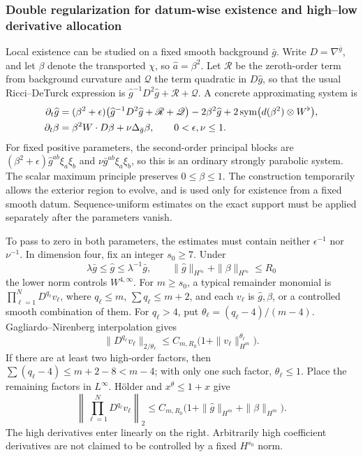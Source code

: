 \documentclass[a4paper,11pt]{article}
\numberwithin{equation}{section}
\theoremstyle{definition}
\begin{document}
\subsubsection{Double regularization for datum-wise existence and high--low derivative allocation}\label{sec:tame-start}
Local existence can be studied on a fixed smooth background $\bar g$. Write $D=\nabla^{\bar g}$,
and let $\beta$ denote the transported $\chi$, so $\widehat a=\beta^2$.
Let $\mathscr R$ be the zeroth-order term from background curvature and $\mathscr Q$ the term quadratic in
$D\widehat g$, so that the usual Ricci--DeTurck expression is
$\widehat g^{-1}D^2\widehat g+\mathscr R+\mathscr Q$.
A concrete approximating system is
\begin{align}
\partial_t\widehat g
&=(\beta^2+\epsilon)
 \bigl(\widehat g^{-1}D^2\widehat g+\mathscr R+\mathscr Q\bigr)
-2\beta^2\widehat g
+2\operatorname{sym}\bigl(d(\beta^2)\otimes W^\flat\bigr),\notag\\
\partial_t\beta
&=\beta^2W\cdot D\beta+\nu\Delta_{\bar g}\beta,
\qquad 0<\epsilon,\nu\le1.\label{eq:double-regularized-start}
\end{align}
For fixed positive parameters, the second-order principal blocks are
$(\beta^2+\epsilon)\widehat g^{ab}\xi_a\xi_b$ and
$\nu\bar g^{ab}\xi_a\xi_b$, so this is an ordinary strongly parabolic system.
The scalar maximum principle preserves $0\le\beta\le1$.
The construction temporarily allows the exterior region to evolve, and is used only for existence from a fixed smooth datum.
Sequence-uniform estimates on the exact support must be applied separately after the parameters vanish.

To pass to zero in both parameters, the estimates must contain neither $\epsilon^{-1}$ nor $\nu^{-1}$.
In dimension four, fix an integer $s_0\ge7$. Under
\[
\lambda\bar g\le\widehat g\le\lambda^{-1}\bar g,
\qquad \|\widehat g\|_{H^{s_0}}+\|\beta\|_{H^{s_0}}\le R_0
\]
the lower norm controls $W^{4,\infty}$. For $m\ge s_0$,
a typical remainder monomial is $\prod_{\ell=1}^N D^{q_\ell}v_\ell$, where
$q_\ell\le m$, $\sum q_\ell\le m+2$, and each $v_\ell$ is
$\widehat g,\beta$, or a controlled smooth combination of them.
For $q_\ell>4$, put $\theta_\ell=(q_\ell-4)/(m-4)$.
Gagliardo--Nirenberg interpolation gives
\[
\|D^{q_\ell}v_\ell\|_{2/\theta_\ell}
\le C_{m,R_0}\bigl(1+\|v_\ell\|_{H^m}^{\theta_\ell}\bigr).
\]
If there are at least two high-order factors, then
$\sum(q_\ell-4)\le m+2-8<m-4$; with only one such factor,
$\theta_\ell\le1$. Place the remaining factors in $L^\infty$. H\"older and
$x^\theta\le1+x$ give
\begin{equation}\label{eq:tame-remainder}
\left\|\prod_{\ell=1}^ND^{q_\ell}v_\ell\right\|_2
\le C_{m,R_0}\bigl(1+\|\widehat g\|_{H^m}+\|\beta\|_{H^m}\bigr).
\end{equation}
The high derivatives enter linearly on the right. Arbitrarily high coefficient derivatives are not claimed to be controlled by a fixed
$H^{s_0}$ norm.
\end{document}
